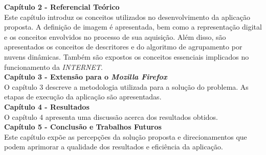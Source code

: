 \noindent
\textbf{Capítulo 2 - Referencial Teórico}\\
Este capítulo introduz os conceitos utilizados no desenvolvimento da aplicação proposta. A definição de imagem é apresentada, bem como a representação digital e os conceitos envolvidos no processo de sua aquisição. Além disso, são apresentados os conceitos de descritores e do algoritmo de agrupamento por nuvens dinâmicas. Também são expostos os conceitos essenciais implicados no funcionamento da \emph{INTERNET}.
\\

\noindent
\textbf{Capítulo 3 - Extensão para o \emph{Mozilla Firefox}}\\
O capítulo 3 descreve a metodologia utilizada para a solução do problema. As etapas de execução da aplicação são apresentadas.
\\

\noindent
\textbf{Capítulo 4 - Resultados}\\
O capítulo 4 apresenta uma discussão acerca dos resultados obtidos. 
\\

\noindent
\textbf{Capítulo 5 - Conclusão e Trabalhos Futuros}\\
Este capítulo expõe as percepções da solução proposta e direcionamentos que podem aprimorar a qualidade dos resultados e eficiência da aplicação.
\\